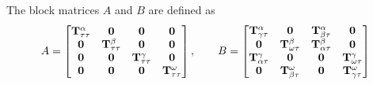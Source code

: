 The block matrices $A$ and $B$ are defined as
\begin{equation}
A = \begin{bmatrix}
\mathbf T^{\alpha}_{\tau\tau} & \mathbf 0 & \mathbf 0 & \mathbf 0 \\
\mathbf 0 & \mathbf T^{\beta}_{\tau\tau} & \mathbf 0 & \mathbf 0  \\
\mathbf 0 & \mathbf 0 & \mathbf T^{\gamma}_{\tau\tau} & \mathbf 0  \\
\mathbf 0& \mathbf 0 & \mathbf 0 & \mathbf T^{\omega}_{\tau\tau} \\
\end{bmatrix}, \qquad
B = \begin{bmatrix}
\mathbf T^{\alpha}_{\gamma\tau} & \mathbf 0              & \mathbf T^{\alpha}_{\beta\tau} & \mathbf 0 \\
\mathbf 0               & \mathbf T^{\beta}_{\omega\tau} & \mathbf T^{\beta}_{\alpha\tau} & \mathbf 0 \\
\mathbf T^{\gamma}_{\alpha\tau} & \mathbf 0              & \mathbf 0              & \mathbf T^{\gamma}_{\omega\tau} \\
\mathbf 0               & \mathbf T^{\omega}_{\beta\tau} & \mathbf 0              & \mathbf T^{\omega}_{\gamma\tau}
\end{bmatrix}
\label{eq:matrix_AB}
\end{equation}

